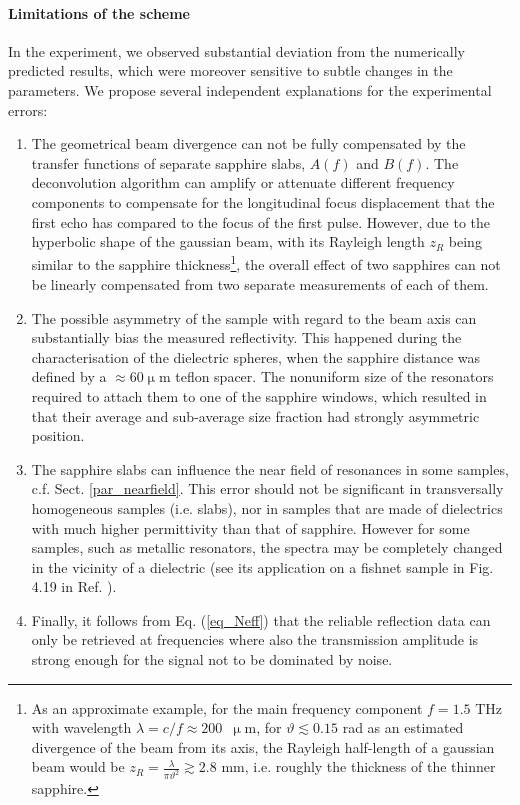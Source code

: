 \paragraph{Limitations of the scheme} %
In the experiment, we observed substantial deviation  %
from the numerically predicted results, which were moreover sensitive to subtle changes in the parameters. We propose  several independent explanations for the experimental errors:
\begin{enumerate}
\item{The geometrical beam divergence can not be fully compensated by the transfer functions of separate sapphire slabs, $A(f)$ and $B(f)$. The deconvolution algorithm can amplify or attenuate different frequency components to compensate for the  longitudinal focus displacement that the first echo has compared to the focus of the first pulse. However, due to the hyperbolic shape of the gaussian beam, with its Rayleigh length $z_{R}$ being similar to the sapphire thickness\footnote{As an approximate example, for the main frequency component $f = 1.5$ THz with wavelength $\lambda = c / f \approx 200$~$\upmu$m, for $\vartheta \lesssim 0.15$ rad as an estimated divergence of the beam from its axis, the Rayleigh half-length of a gaussian beam would be $z_{R} = \frac{\lambda}{\pi \vartheta^{2}} \gtrsim 2.8$ mm, i.e. roughly the thickness of the thinner sapphire.}, the overall effect of two sapphires can not be linearly compensated from two separate measurements of each of them.} 
 \item{The possible asymmetry of the sample with regard to the beam axis can substantially bias the measured reflectivity. This happened during the characterisation of the dielectric spheres, when the sapphire distance was defined by a $\approx$60$\upmu$m teflon spacer. The nonuniform size of the resonators required to attach them to one of the sapphire windows, which resulted in that their average and sub-average size fraction had strongly asymmetric position. } 
 \item{The sapphire slabs can influence the near field of resonances in some samples, c.f. Sect. \ref{par_nearfield}. This error should not be significant in transversally homogeneous samples (i.e. slabs), nor in samples that are made of dielectrics with much higher permittivity than that of sapphire. However for some samples, such as metallic resonators, the spectra may be completely changed in the vicinity of a dielectric (see its application on a fishnet sample in Fig. 4.19 in Ref. \cite{yahiaoui2011phd}). }
 \item{Finally, it follows from Eq. (\ref{eq_Neff})
 that the reliable reflection data can only be retrieved at frequencies where also the transmission amplitude is strong enough for the signal not to be dominated by noise. }
 \end{enumerate}
\label{srtm2}

